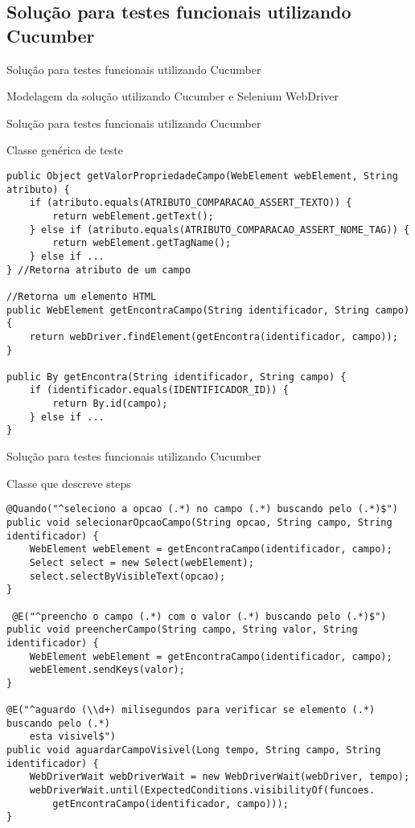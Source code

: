 \documentclass{beamer}
\begin{document}
\subsection{Solução para testes funcionais utilizando Cucumber}
\begin{frame}{Solução para testes funcionais utilizando Cucumber}
    \item Modelagem da solução utilizando Cucumber e Selenium WebDriver
	\begin{center}\end{center}
\end{frame}
\begin{frame}[fragile]{Solução para testes funcionais utilizando Cucumber}
    \item Classe genérica de teste
    \begin{lstlisting}
public Object getValorPropriedadeCampo(WebElement webElement, String atributo) {
    if (atributo.equals(ATRIBUTO_COMPARACAO_ASSERT_TEXTO)) {
        return webElement.getText();
    } else if (atributo.equals(ATRIBUTO_COMPARACAO_ASSERT_NOME_TAG)) {
        return webElement.getTagName();
    } else if ...
} //Retorna atributo de um campo

//Retorna um elemento HTML
public WebElement getEncontraCampo(String identificador, String campo) {
    return webDriver.findElement(getEncontra(identificador, campo));
}

public By getEncontra(String identificador, String campo) {
    if (identificador.equals(IDENTIFICADOR_ID)) {
        return By.id(campo);
    } else if ...
}
	\end{lstlisting}
\end{frame}
\begin{frame}[fragile]{Solução para testes funcionais utilizando Cucumber}
    \item Classe que descreve steps
    \begin{lstlisting}
@Quando("^seleciono a opcao (.*) no campo (.*) buscando pelo (.*)$")
public void selecionarOpcaoCampo(String opcao, String campo, String identificador) {
    WebElement webElement = getEncontraCampo(identificador, campo);
    Select select = new Select(webElement);
    select.selectByVisibleText(opcao);
}

 @E("^preencho o campo (.*) com o valor (.*) buscando pelo (.*)$")
public void preencherCampo(String campo, String valor, String identificador) {
    WebElement webElement = getEncontraCampo(identificador, campo);
    webElement.sendKeys(valor);
}

@E("^aguardo (\\d+) milisegundos para verificar se elemento (.*) buscando pelo (.*)
    esta visivel$")
public void aguardarCampoVisivel(Long tempo, String campo, String identificador) {
    WebDriverWait webDriverWait = new WebDriverWait(webDriver, tempo);
    webDriverWait.until(ExpectedConditions.visibilityOf(funcoes.
        getEncontraCampo(identificador, campo)));
}
    \end{lstlisting}
\end{frame}
\end{document}
